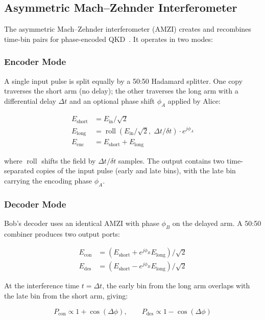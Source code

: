 \documentclass[3p,times,preprint]{elsarticle}
\begin{document}
\subsection{Asymmetric Mach--Zehnder Interferometer}

The asymmetric Mach--Zehnder interferometer (AMZI) creates and recombines
time-bin pairs for phase-encoded QKD~\cite{townsend}.  It operates in two
modes:

\subsubsection{Encoder Mode}

A single input pulse is split equally by a 50:50 Hadamard splitter.  One
copy traverses the short arm (no delay); the other traverses the long arm
with a differential delay $\Delta t$ and an optional phase shift
$\phi_A$ applied by Alice:

\begin{align}
  E_{\text{short}} &= E_{\text{in}} / \sqrt{2} \\
  E_{\text{long}} &= \operatorname{roll}(E_{\text{in}} / \sqrt{2},\;
    \Delta t / \delta t) \cdot e^{j\phi_A} \\
  E_{\text{enc}} &= E_{\text{short}} + E_{\text{long}}
\end{align}

where $\operatorname{roll}$ shifts the field by $\Delta t / \delta t$
samples.  The output contains two time-separated copies of the input
pulse (early and late bins), with the late bin carrying the encoding
phase $\phi_A$.

\subsubsection{Decoder Mode}

Bob's decoder uses an identical AMZI with phase $\phi_B$ on the delayed
arm.  A 50:50 combiner produces two output ports:

\begin{align}
  E_{\text{con}} &= (E_{\text{short}} + e^{j\phi_B} E_{\text{long}})
    / \sqrt{2} \\
  E_{\text{des}} &= (E_{\text{short}} - e^{j\phi_B} E_{\text{long}})
    / \sqrt{2}
\end{align}

At the interference time $t = \Delta t$, the early bin from the long arm
overlaps with the late bin from the short arm, giving:

\begin{equation}
  P_{\text{con}} \propto 1 + \cos(\Delta\phi),\qquad
  P_{\text{des}} \propto 1 - \cos(\Delta\phi)
  \label{eq:amzi-interference}
\end{equation}
\end{document}
